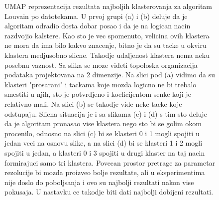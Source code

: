 \documentclass{article}
\begin{document}
\begin{figure}[!h]
    \centering
    \caption{ UMAP reprezentacija rezultata najboljih klasterovanja za algoritam Louvain po datotekama. U prvoj grupi (a) i (b) deluje da je algoritam odradio dosta dobar posao i da je na logican nacin razdvojio kalstere. Kao sto je vec spomenuto, velicina ovih klastera ne mora da ima bilo kakvo znacenje, bitno je da su tacke u okviru klastera medjusobno slicne. Takodje udaljenost klastera nema neku posebnu vaznost. Sa slika se moze videti topoloska organizacija podataka projektovana na 2 dimenzije. Na slici pod (a) vidimo da su klasteri "prosarani" i tackama koje mozda logicno ne bi trebalo smestiti u njih, sto je potvrdjeno i koeficijentom senke koji je relativno mali. Na slici (b) se takodje vide neke tacke koje odstupaju. Slicna situacija je i sa slikama (c) i (d) s tim sto deluje da je algoritam pronasao vise klastera nego sto bi se golim okom procenilo, odnosno na slici (c) bi se klasteri 0 i 1 mogli spojiti u jedan veci na osnovu slike, a na slici (d) bi se klasteri 1 i 2 mogli spojiti u jedan, a klasteri 0 i 3 spojiti u drugi klaster na taj nacin formirajuci samo tri klastera. Povecan prostor pretrage za parametar rezolucije bi mozda proizveo bolje rezultate, ali u eksperimentima nije doslo do poboljsanja i ovo su najbolji rezultati nakon vise pokusaja. U nastavku ce takodje biti dati najbolji dobijeni rezultati. }
    \label{fig:best_louvain}
\end{figure}
\end{document}

